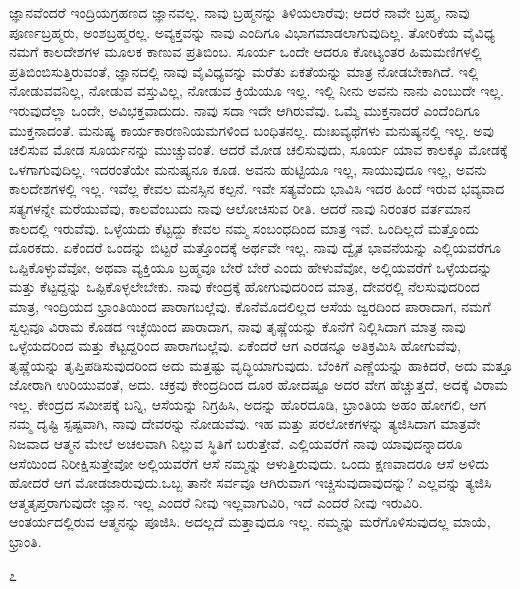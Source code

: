 ಜ್ಞಾನವೆಂದರೆ ಇಂದ್ರಿಯಗ್ರಹಣದ ಜ್ಞಾನವಲ್ಲ. ನಾವು ಬ್ರಹ್ಮನನ್ನು ತಿಳಿಯಲಾರೆವು; ಆದರೆ ನಾವೇ ಬ್ರಹ್ಮ, ನಾವು ಪೂರ್ಣಬ್ರಹ್ಮರು, ಅಂಶಬ್ರಹ್ಮರಲ್ಲ. ಅವ್ಯಕ್ತವನ್ನು ನಾವು ಎಂದಿಗೂ ವಿಭಾಗಮಾಡಲಾಗುವುದಿಲ್ಲ. ತೋರಿಕೆಯ ವೈವಿಧ್ಯ ನಮಗೆ ಕಾಲದೇಶಗಳ ಮೂಲಕ ಕಾಣುವ ಪ್ರತಿಬಿಂಬ. ಸೂರ್ಯ ಒಂದೇ ಆದರೂ ಕೋಟ್ಯಂತರ ಹಿಮಮಣಿಗಳಲ್ಲಿ ಪ್ರತಿಬಿಂಬಿಸುತ್ತಿರುವಂತೆ, ಜ್ಞಾನದಲ್ಲಿ ನಾವು ವೈವಿಧ್ಯವನ್ನು ಮರೆತು ಏಕತೆಯನ್ನು ಮಾತ್ರ ನೋಡಬೇಕಾಗಿದೆ. ಇಲ್ಲಿ ನೋಡುವವನಿಲ್ಲ, ನೋಡುವ ವಸ್ತುವಿಲ್ಲ, ನೋಡುವ ಕ್ರಿಯೆಯೂ ಇಲ್ಲ. ಇಲ್ಲಿ ನೀನು ಅವನು ನಾನು ಎಂಬುದೇ ಇಲ್ಲ. ಇರುವುದೆಲ್ಲಾ ಒಂದೇ, ಅವಿಭಕ್ತವಾದುದು. ನಾವು ಸದಾ ಇದೇ ಆಗಿರುವೆವು. ಒಮ್ಮೆ ಮುಕ್ತನಾದರೆ ಎಂದೆಂದಿಗೂ ಮುಕ್ತನಾದಂತೆ. ಮನುಷ್ಯ ಕಾರ್ಯಕಾರಣನಿಯಮಗಳಿಂದ ಬಂಧಿತನಲ್ಲ. ದುಃಖವ್ಯಥೆಗಳು ಮನುಷ್ಯನಲ್ಲಿ ಇಲ್ಲ. ಅವು ಚಲಿಸುವ ಮೋಡ ಸೂರ್ಯನನ್ನು ಮುಚ್ಚುವಂತೆ. ಆದರೆ ಮೋಡ ಚಲಿಸುವುದು, ಸೂರ್ಯ ಯಾವ ಕಾಲಕ್ಕೂ ಮೋಡಕ್ಕೆ ಒಳಗಾಗುವುದಿಲ್ಲ. ಇದರಂತೆಯೇ ಮನುಷ್ಯನೂ ಕೂಡ. ಅವನು ಹುಟ್ಟಿಯೂ ಇಲ್ಲ, ಸಾಯುವುದೂ ಇಲ್ಲ, ಅವನು ಕಾಲದೇಶಗಳಲ್ಲಿ ಇಲ್ಲ. ಇವೆಲ್ಲ ಕೇವಲ ಮನಸ್ಸಿನ ಕಲ್ಪನೆ. ಇವೇ ಸತ್ಯವೆಂದು ಭಾವಿಸಿ ಇದರ ಹಿಂದೆ ಇರುವ ಭವ್ಯವಾದ ಸತ್ಯಗಳನ್ನೇ ಮರೆಯುವೆವು, ಕಾಲವೆಂಬುದು ನಾವು ಆಲೋಚಿಸುವ ರೀತಿ. ಆದರೆ ನಾವು ನಿರಂತರ ವರ್ತಮಾನ ಕಾಲದಲ್ಲಿ ಇರುವೆವು. ಒಳ್ಳೆಯದು ಕೆಟ್ಟದ್ದು ಕೇವಲ ನಮ್ಮ ಸಂಬಂಧದಿಂದ ಮಾತ್ರ ಇವೆ. ಒಂದಿಲ್ಲದೆ ಮತ್ತೊಂದು ದೊರಕದು. ಏಕೆಂದರೆ ಒಂದನ್ನು ಬಿಟ್ಟರೆ ಮತ್ತೊಂದಕ್ಕೆ ಅರ್ಥವೇ ಇಲ್ಲ. ನಾವು ದ್ವೈತ ಭಾವನೆಯನ್ನು ಎಲ್ಲಿಯವರೆಗೂ ಒಪ್ಪಿಕೊಳ್ಳುವೆವೋ, ಅಥವಾ ವ್ಯಕ್ತಿಯೂ ಬ್ರಹ್ಮವೂ ಬೇರೆ ಬೇರೆ ಎಂದು ಹೇಳುವೆವೋ, ಅಲ್ಲಿಯವರೆಗೆ ಒಳ್ಳೆಯದನ್ನು ಮತ್ತು ಕೆಟ್ಟದ್ದನ್ನು ಒಪ್ಪಿಕೊಳ್ಳಲೇಬೇಕು. ನಾವು ಕೇಂದ್ರಕ್ಕೆ ಹೋಗುವುದರಿಂದ ಮಾತ್ರ, ದೇವರಲ್ಲಿ ನೆಲಸುವುದರಿಂದ ಮಾತ್ರ, ಇಂದ್ರಿಯದ ಭ್ರಾಂತಿಯಿಂದ ಪಾರಾಗಬಲ್ಲೆವು. ಕೊನೆಮೊದಲಿಲ್ಲದ ಆಸೆಯ ಜ್ವರದಿಂದ ಪಾರಾದಾಗ, ನಮಗೆ ಸ್ವಲ್ಪವೂ ವಿರಾಮ ಕೊಡದ ಇಚ್ಛೆಯಿಂದ ಪಾರಾದಾಗ, ನಾವು ತೃಷ್ಣೆಯನ್ನು ಕೊನೆಗೆ ನಿಲ್ಲಿಸಿದಾಗ ಮಾತ್ರ ನಾವು ಒಳ್ಳೆಯದರಿಂದ ಮತ್ತು ಕೆಟ್ಟದ್ದರಿಂದ ಪಾರಾಗಬಲ್ಲೆವು. ಏಕೆಂದರೆ ಆಗ ಎರಡನ್ನೂ ಅತಿಕ್ರಮಿಸಿ ಹೋಗುವೆವು, ತೃಷ್ಣೆಯನ್ನು ತೃಪ್ತಿಪಡಿಸುವುದರಿಂದ ಅದು ಮತ್ತಷ್ಟು ವೃದ್ಧಿಯಾಗುವುದು. ಬೆಂಕಿಗೆ ಎಣ್ಣೆಯನ್ನು ಹಾಕಿದರೆ, ಅದು ಮತ್ತೂ ಜೋರಾಗಿ ಉರಿಯುವಂತೆ, ಅದು. ಚಕ್ರವು ಕೇಂದ್ರದಿಂದ ದೂರ ಹೋದಷ್ಟೂ ಅದರ ವೇಗ ಹೆಚ್ಚುತ್ತದೆ, ಅದಕ್ಕೆ ವಿರಾಮ ಇಲ್ಲ. ಕೇಂದ್ರದ ಸಮೀಪಕ್ಕೆ ಬನ್ನಿ, ಆಸೆಯನ್ನು ನಿಗ್ರಹಿಸಿ, ಅದನ್ನು ಹೊರದೂಡಿ, ಭ್ರಾಂತಿಯ ಅಹಂ ಹೋಗಲಿ, ಆಗ ನಮ್ಮ ದೃಷ್ಟಿ ಸ್ಪಷ್ಟವಾಗಿ, ನಾವು ದೇವರನ್ನು ನೋಡುವೆವು. ಇಹ ಮತ್ತು ಪರಲೋಕಗಳನ್ನು ತ್ಯಜಿಸಿದಾಗ ಮಾತ್ರವೇ ನಿಜವಾದ ಆತ್ಮನ ಮೇಲೆ ಅಚಲವಾಗಿ ನಿಲ್ಲುವ ಸ್ಥಿತಿಗೆ ಬರುತ್ತೇವೆ. ಎಲ್ಲಿಯವರೆಗೆ ನಾವು ಯಾವುದನ್ನಾದರೂ ಆಸೆಯಿಂದ ನಿರೀಕ್ಷಿಸುತ್ತೇವೋ ಅಲ್ಲಿಯವರೆಗೆ ಆಸೆ ನಮ್ಮನ್ನು ಆಳುತ್ತಿರುವುದು. ಒಂದು ಕ್ಷಣವಾದರೂ ಆಸೆ ಅಳಿದು ಹೋದರೆ ಆಗ ಮೋಡಜಾರುವುದು.ಒಬ್ಬ ತಾನೇ ಸರ್ವವೂ ಆಗಿರುವಾಗ ಇಚ್ಚಿಸುವುದಾವುದನ್ನು? ಎಲ್ಲವನ್ನು ತ್ಯಜಿಸಿ ಆತ್ಮತೃಪ್ತರಾಗುವುದೇ ಜ್ಞಾನ. ಇಲ್ಲ ಎಂದರೆ ನೀವು ಇಲ್ಲವಾಗುವಿರಿ, ಇದೆ ಎಂದರೆ ನೀವು ಇರುವಿರಿ. ಆಂತರ್ಯದಲ್ಲಿರುವ ಆತ್ಮನನ್ನು ಪೂಜಿಸಿ. ಅದಲ್ಲದೆ ಮತ್ತಾವುದೂ ಇಲ್ಲ. ನಮ್ಮನ್ನು ಮರೆಗೊಳಿಸುವುದಲ್ಲ ಮಾಯೆ, ಭ್ರಾಂತಿ.

\begin{center}
೭
\end{center}

